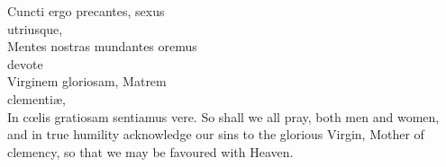 Cuncti ergo precantes, sexus\\
\phantom{tab} utriusque,\\
Mentes nostras mundantes oremus\\
\phantom{tab} devote\\
Virginem gloriosam, Matrem\\
\phantom{tab} clementiæ,\\
In cœlis gratiosam sentiamus vere.
\divverse
So shall we all pray, both men
and women, and in true humility
acknowledge our sins to the glorious
Virgin, Mother of clemency, so that
we may be favoured with Heaven.
\finishverse


\setlength{\englishwidth}{0.5\textwidth}
\setlength{\latinwidth}{0.48\textwidth}
\setlength{\interwidth}{10pt}
\setlength{\preverseskip}{10pt}
\renewcommand{\betweenLilyPondSystem}[1]{\linebreak}
